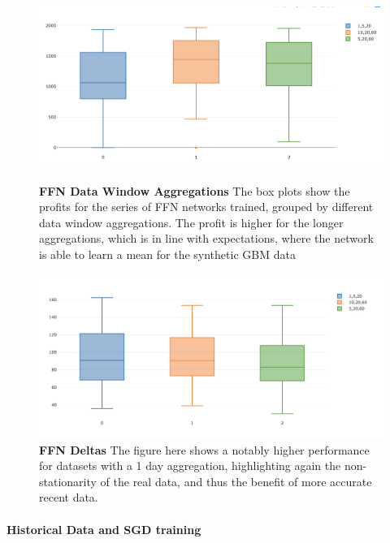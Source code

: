 \documentclass[a4paper,latin]{paper}
\begin{document}
\begin{figure}[H]
	\centering
	\begin{minipage}{0.45\textwidth}
		\centering 
		\includegraphics[scale=0.3]{images/iteration_four/it4_ffn_deltas.png}
		\caption{\textbf{FFN Data Window Aggregations} \newline The box plots show the profits for the series of FFN networks trained, grouped by different data window aggregations. The profit is higher for the longer aggregations, which is in line with expectations, where the network is able to learn a mean for the synthetic GBM data}
		\label{figure-it5_ffn_deltas}
	\end{minipage}\hfill
	\begin{minipage}{0.45\textwidth}
		\centering \includegraphics[scale=0.3]{images/iteration_five/it5_delta_ffn.png}
		\caption{\textbf{FFN Deltas} 
			\newline The figure here shows a notably higher performance for datasets with a 1 day aggregation, highlighting again the non-stationarity of the real data, and thus the benefit of more accurate recent data.}
		\label{figure-it5_delta_ffn}
	\end{minipage}
\end{figure}


\paragraph{Historical Data and SGD training}
\end{document}
